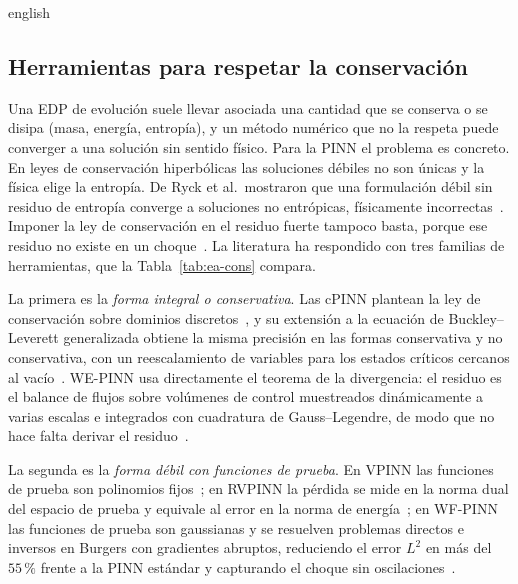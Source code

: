 \documentclass[0000.tex]{subfiles}
\begin{document}
\begin{hyphenrules}{english}
\subsection{Herramientas para respetar la conservación}
\label{subsec:ea-cons}

Una EDP de evolución suele llevar asociada una cantidad que se conserva o se disipa (masa, energía, entropía), y un método numérico que no la respeta puede converger a una solución sin sentido físico. Para la PINN el problema es concreto. En leyes de conservación hiperbólicas las soluciones débiles no son únicas y la física elige la entropía. De Ryck et al.\ mostraron que una formulación débil sin residuo de entropía converge a soluciones no entrópicas, físicamente incorrectas~\cite{de2024wpinns}. Imponer la ley de conservación en el residuo fuerte tampoco basta, porque ese residuo no existe en un choque~\cite{chaumet2024improving}. La literatura ha respondido con tres familias de herramientas, que la Tabla~\ref{tab:ea-cons} compara.

La primera es la \emph{forma integral o conservativa}. Las cPINN plantean la ley de conservación sobre dominios discretos~\cite{jagtap2020conservative}, y su extensión a la ecuación de Buckley--Leverett generalizada obtiene la misma precisión en las formas conservativa y no conservativa, con un reescalamiento de variables para los estados críticos cercanos al vacío~\cite{quita2023conservative}. WE-PINN usa directamente el teorema de la divergencia: el residuo es el balance de flujos sobre volúmenes de control muestreados dinámicamente a varias escalas e integrados con cuadratura de Gauss--Legendre, de modo que no hace falta derivar el residuo~\cite{oubarka2026weak}.

La segunda es la \emph{forma débil con funciones de prueba}. En VPINN las funciones de prueba son polinomios fijos~\cite{kharazmi2019vpinns}; en RVPINN la pérdida se mide en la norma dual del espacio de prueba y equivale al error en la norma de energía~\cite{rojas2024robust}; en WF-PINN las funciones de prueba son gaussianas y se resuelven problemas directos e inversos en Burgers con gradientes abruptos, reduciendo el error $L^2$ en más del $55\,\%$ frente a la PINN estándar y capturando el choque sin oscilaciones~\cite{wang2025wf}.


\end{hyphenrules}
\end{document}
